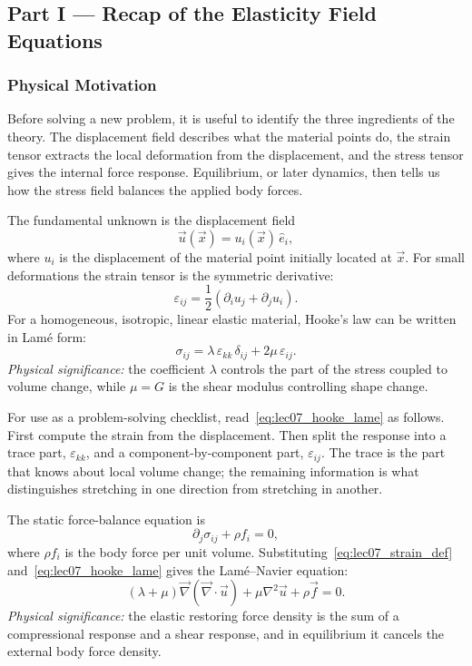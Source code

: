 \documentclass[../main.tex]{subfiles}
\begin{document}
\subsection*{Part I — Recap of the Elasticity Field Equations}

\subsubsection*{Physical Motivation}
Before solving a new problem, it is useful to identify the three ingredients of the theory. The displacement field describes what the material points do, the strain tensor extracts the local deformation from the displacement, and the stress tensor gives the internal force response. Equilibrium, or later dynamics, then tells us how the stress field balances the applied body forces.

The fundamental unknown is the displacement field
\[
    \vec{u}(\vec{x}) = u_i(\vec{x})\,\hat{e}_i,
\]
where $u_i$ is the displacement of the material point initially located at $\vec{x}$. For small deformations the strain tensor is the symmetric derivative:
\begin{equation}
    \varepsilon_{ij}
    = \frac{1}{2}\left(\partial_i u_j+\partial_j u_i\right).
    \label{eq:lec07_strain_def}
\end{equation}
For a homogeneous, isotropic, linear elastic material, Hooke's law can be written in Lamé form:
\begin{equation}
    \boxed{\sigma_{ij}
    = \lambda\,\varepsilon_{kk}\,\delta_{ij}
      +2\mu\,\varepsilon_{ij}.}
    \label{eq:lec07_hooke_lame}
\end{equation}
\textit{Physical significance:} the coefficient $\lambda$ controls the part of the stress coupled to volume change, while $\mu=G$ is the shear modulus controlling shape change.

For use as a problem-solving checklist, read~\eqref{eq:lec07_hooke_lame} as follows. First compute the strain from the displacement. Then split the response into a trace part, $\varepsilon_{kk}$, and a component-by-component part, $\varepsilon_{ij}$. The trace is the part that knows about local volume change; the remaining information is what distinguishes stretching in one direction from stretching in another.

The static force-balance equation is
\begin{equation}
    \partial_j\sigma_{ij}+\rho f_i = 0,
    \label{eq:lec07_static_equilibrium}
\end{equation}
where $\rho f_i$ is the body force per unit volume. Substituting~\eqref{eq:lec07_strain_def} and~\eqref{eq:lec07_hooke_lame} gives the Lamé--Navier equation:
\begin{equation}
    \boxed{
    (\lambda+\mu)\vec{\nabla}(\vec{\nabla}\cdot\vec{u})
    +\mu\nabla^2\vec{u}
    +\rho\vec{f}=0.}
    \label{eq:lec07_lame_navier_static}
\end{equation}
\textit{Physical significance:} the elastic restoring force density is the sum of a compressional response and a shear response, and in equilibrium it cancels the external body force density.
\end{document}
